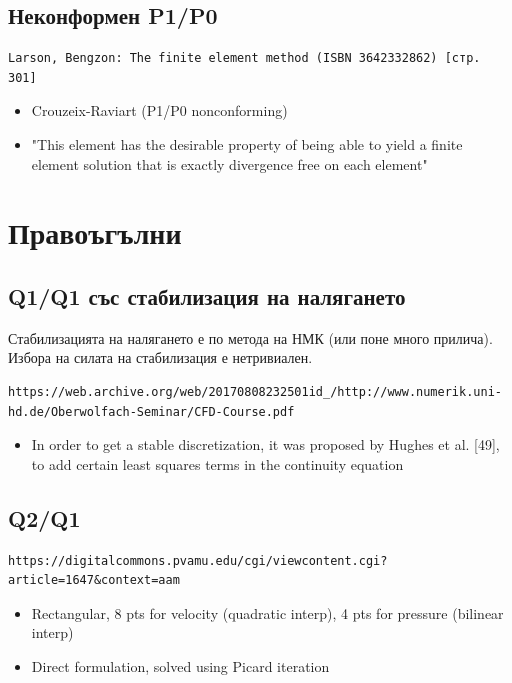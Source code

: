 \documentclass[fleqn,12pt]{article}
\begin{document}
\subsection{Неконформен P1/P0}
\begin{verbatim}
Larson, Bengzon: The finite element method (ISBN 3642332862) [стр. 301] 
\end{verbatim}
\begin{itemize}
    \item Crouzeix-Raviart (P1/P0 nonconforming)
    \item "This element has the desirable property of being able to yield a finite
       element solution that is exactly divergence free on each element"

\end{itemize}

\section{Правоъгълни}

\subsection{Q1/Q1 със стабилизация на налягането}

Стабилизацията на налягането е по метода на НМК (или поне много прилича).
Избора на силата на стабилизация е нетривиален.

\begin{verbatim}
https://web.archive.org/web/20170808232501id_/http://www.numerik.uni-hd.de/Oberwolfach-Seminar/CFD-Course.pdf
\end{verbatim}
    \begin{itemize}
        \item In order to get a stable discretization, it was proposed by Hughes et al. [49],
        to add certain least squares terms in the continuity equation
\end{itemize}
    

\subsection{Q2/Q1}
\begin{verbatim}
https://digitalcommons.pvamu.edu/cgi/viewcontent.cgi?article=1647&context=aam    
\end{verbatim}
\begin{itemize}
    \item Rectangular, 8 pts for velocity (quadratic interp), 4 pts for pressure (bilinear interp)
    \item Direct formulation, solved using Picard iteration
\end{itemize}
\end{document}
